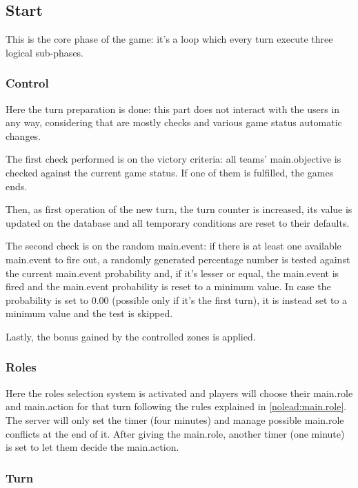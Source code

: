 		\subsection{Start}
			
			This is the core phase of the game: it's a loop which every turn execute three logical sub-phases.
				
			\subsubsection{Control}
			
				Here the turn preparation is done: this part does not interact with the users in any way, considering that are mostly checks and various game status automatic changes.
			
				The first check performed is on the victory criteria: all teams' main.objective is checked against the current game status. If one of them is fulfilled, the games ends.
				
				Then, as first operation of the new turn, the turn counter is increased, its value is updated on the database and all temporary conditions are reset to their defaults.
				
				The second check is on the random main.event: if there is at least one available main.event to fire out, a randomly generated percentage number is tested against the current main.event probability and, if it's lesser or equal, the main.event is fired and the main.event probability is reset to a minimum value.
				In case the probability is set to 0.00 (possible only if it's the first turn), it is instead set to a minimum value and the test is skipped.
				
				Lastly, the bonus gained by the controlled zones is applied.
				
			\subsubsection{Roles}
			
				Here the roles selection system is activated and players will choose their main.role and main.action for that turn following the rules explained in \autoref{nolead:main.role}.
				The server will only set the timer (four minutes) and manage possible main.role conflicts at the end of it.
				After giving the main.role, another timer (one minute) is set to let them decide the main.action.
			
			\subsubsection{Turn}
			
